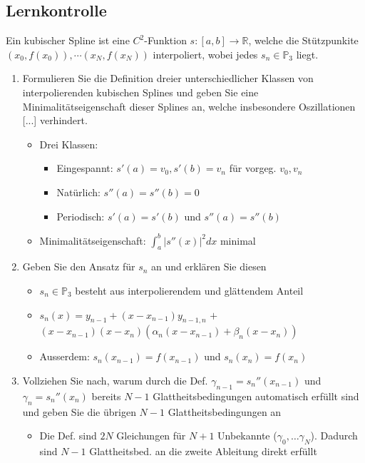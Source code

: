 \documentclass[]{article}
\newcommand*{\poly}{\ensuremath{\mathbb{P}}}
\newcommand*{\real}{\ensuremath{\mathbb{R}}}
\begin{document}
\subsection{Lernkontrolle}
	Ein kubischer Spline ist eine $C^2$-Funktion $s: [a,b] \rightarrow \real$, welche die Stützpunkite $(x_0, f(x_0)), \cdots (x_N, f(x_N))$ interpoliert, wobei jedes $s_n \in \poly_3$ liegt.
	\begin{enumerate}
		\item Formulieren Sie die Definition dreier unterschiedlicher Klassen von interpolierenden kubischen Splines und geben Sie eine Minimalitätseigenschaft dieser Splines an, welche insbesondere Oszillationen [...] verhindert.
			\begin{itemize}
				\item Drei Klassen:
					\begin{itemize}
						\item Eingespannt: $s'(a) = v_0, s'(b)=v_n$ für vorgeg. $v_0, v_n$
						\item Natürlich: $s''(a)=s''(b)=0$
						\item Periodisch: $s'(a)=s'(b)$ und $s''(a)=s''(b)$
					\end{itemize}
				\item Minimalitätseigenschaft: $\int_a^b |s''(x)|^2 dx$ minimal
			\end{itemize}
		\item Geben Sie den Ansatz für $s_n$ an und erklären Sie diesen
			\begin{itemize}
				\item $s_n \in \poly_3$ besteht aus interpolierendem und glättendem Anteil
				\item $s_n(x) = y_{n-1} + (x - x_{n-1}) y_{n-1, n}$ $ + $  \\
								$(x - x_{n-1})( x - x_n) ( \alpha_n (x - x_{n-1}) + \beta_n (x - x_n) ) $
				\item Ausserdem: $s_n(x_{n-1}) = f(x_{n-1})$ und $s_n(x_n) = f(x_n)$				
			\end{itemize}	
		\item Vollziehen Sie nach, warum durch die Def. $\gamma_{n-1} = s_n ''(x_{n-1})$ und $ \gamma_n = s_n ''(x_n)$ bereits $N-1$ Glattheitsbedingungen automatisch erfüllt sind und geben Sie die übrigen $N-1$ Glattheitsbedingungen an
			\begin{itemize}
				\item Die Def. sind $2N$ Gleichungen für $N+1$ Unbekannte ($\gamma_0, \dots \gamma_N$). Dadurch sind $N-1$ Glattheitsbed. an die zweite Ableitung direkt erfüllt

\end{itemize}
\end{enumerate}
\end{document}
